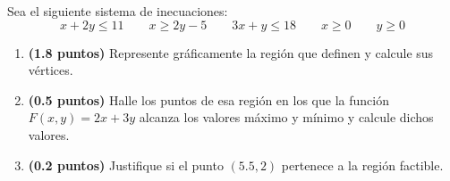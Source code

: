 
Sea el siguiente sistema de inecuaciones:
\[
x+2y\leq11\qquad x\geq2y-5\qquad3x+y\leq18\qquad x\geq0\qquad y\geq0
\]
\begin{enumerate}[label=\alph*)]
\item \textbf{(1.8 puntos)} Represente gráficamente la región que definen y calcule sus vértices.
\item \textbf{(0.5 puntos)} Halle los puntos de esa región en los que la función $F(x,y)=2x+3y$ alcanza los valores máximo y mínimo y calcule dichos valores.
\item \textbf{(0.2 puntos)} Justifique si el punto $(5.5,2)$ pertenece a la región factible.
\end{enumerate}
